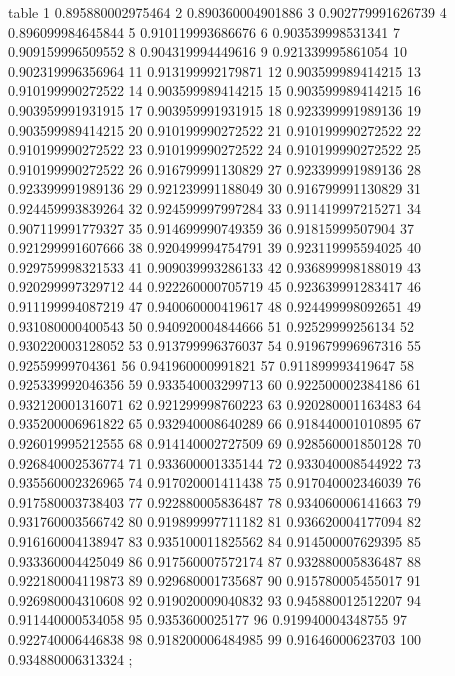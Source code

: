 table {%
	1 0.895880002975464
	2 0.890360004901886
	3 0.902779991626739
	4 0.896099984645844
	5 0.910119993686676
	6 0.903539998531341
	7 0.909159996509552
	8 0.904319994449616
	9 0.921339995861054
	10 0.902319996356964
	11 0.913199992179871
	12 0.903599989414215
	13 0.910199990272522
	14 0.903599989414215
	15 0.903599989414215
	16 0.903959991931915
	17 0.903959991931915
	18 0.923399991989136
	19 0.903599989414215
	20 0.910199990272522
	21 0.910199990272522
	22 0.910199990272522
	23 0.910199990272522
	24 0.910199990272522
	25 0.910199990272522
	26 0.916799991130829
	27 0.923399991989136
	28 0.923399991989136
	29 0.921239991188049
	30 0.916799991130829
	31 0.924459993839264
	32 0.924599997997284
	33 0.911419997215271
	34 0.907119991779327
	35 0.914699990749359
	36 0.91815999507904
	37 0.921299991607666
	38 0.920499994754791
	39 0.923119995594025
	40 0.929759998321533
	41 0.909039993286133
	42 0.936899998188019
	43 0.920299997329712
	44 0.922260000705719
	45 0.923639991283417
	46 0.911199994087219
	47 0.940060000419617
	48 0.924499998092651
	49 0.931080000400543
	50 0.940920004844666
	51 0.92529999256134
	52 0.930220003128052
	53 0.913799996376037
	54 0.919679996967316
	55 0.92559999704361
	56 0.941960000991821
	57 0.911899993419647
	58 0.925339992046356
	59 0.933540003299713
	60 0.922500002384186
	61 0.932120001316071
	62 0.921299998760223
	63 0.920280001163483
	64 0.935200006961822
	65 0.932940008640289
	66 0.918440001010895
	67 0.926019995212555
	68 0.914140002727509
	69 0.928560001850128
	70 0.926840002536774
	71 0.933600001335144
	72 0.933040008544922
	73 0.935560002326965
	74 0.917020001411438
	75 0.917040002346039
	76 0.917580003738403
	77 0.922880005836487
	78 0.934060006141663
	79 0.931760003566742
	80 0.919899997711182
	81 0.936620004177094
	82 0.916160004138947
	83 0.935100011825562
	84 0.914500007629395
	85 0.933360004425049
	86 0.917560007572174
	87 0.932880005836487
	88 0.922180004119873
	89 0.929680001735687
	90 0.915780005455017
	91 0.926980004310608
	92 0.919020009040832
	93 0.945880012512207
	94 0.911440000534058
	95 0.9353600025177
	96 0.919940004348755
	97 0.922740006446838
	98 0.918200006484985
	99 0.91646000623703
	100 0.934880006313324
};
